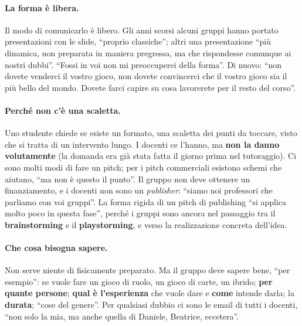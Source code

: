 \paragraph{La forma è libera.} Il modo di comunicarlo è libero. Gli anni scorsi alcuni
gruppi hanno portato presentazioni con le slide, ``proprio classiche''; altri una
presentazione ``più dinamica, non preparata in maniera pregressa, ma che rispondesse
comunque ai nostri dubbi''. ``Fossi in voi non mi preoccuperei della forma''. Di
nuovo: ``non dovete venderci il vostro gioco, non dovete convincerci che il vostro
gioco sia il più bello del mondo. Dovete farci capire su cosa lavorerete per il resto
del corso''.

\paragraph{Perché non c'è una scaletta.} Uno studente chiede se esiste un formato, una
scaletta dei punti da toccare, visto che si tratta di un intervento lungo. I docenti
ce l'hanno, ma \textbf{non la danno volutamente} (la domanda era già stata fatta il
giorno prima nel tutoraggio). Ci sono molti modi di fare un pitch; per i pitch
commerciali esistono schemi che aiutano, ``ma non è questo il punto''. Il gruppo non
deve ottenere un finanziamento, e i docenti non sono un \emph{publisher}: ``siamo noi
professori che parliamo con voi gruppi''. La forma rigida di un pitch di publishing
``si applica molto poco in questa fase'', perché i gruppi sono ancora nel passaggio
tra il \textbf{brainstorming} e il \textbf{playstorming}, e verso la realizzazione
concreta dell'idea.

\paragraph{Che cosa bisogna sapere.} Non serve niente di fisicamente preparato. Ma il
gruppo deve sapere bene, ``per esempio'': se vuole fare un gioco di ruolo, un gioco di
carte, un ibrido; \textbf{per quante persone}; \textbf{qual è l'esperienza} che vuole
dare e \textbf{come} intende darla; la \textbf{durata}; ``cose del genere''. Per
qualsiasi dubbio ci sono le email di tutti i docenti, ``non solo la mia, ma anche
quella di Daniele, Beatrice, eccetera''.

